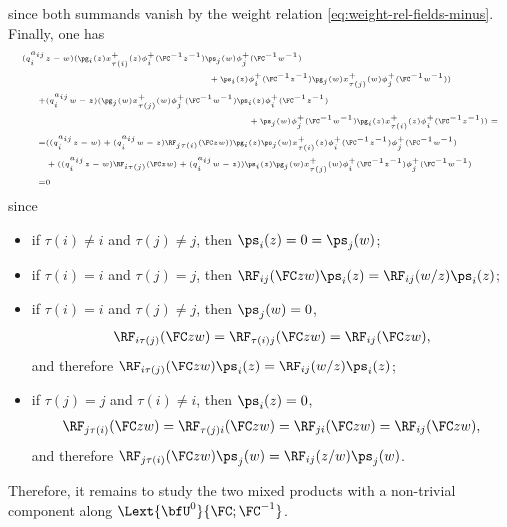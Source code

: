 \documentclass[reqno]{amsart}
\numberwithin{equation}{section}
\begin{document}
since both summands vanish by the weight relation \eqref{eq:weight-rel-fields-minus}.\\
Finally, one has
\begin{equation}\label{eq:quadratic-BC}
\tiny
\begin{split}
(q_i^{a_{ij}}&z-w)
(
\pg_i(z)x_{\tau(i)}^+(z)\phi_i^+(\FC^{-1}z^{-1})
\ps_j(w)\phi^+_j(\FC^{-1}w^{-1})\\
&\hspace{4.1cm}+\ps_i(z)\phi^+_i(\FC^{-1}z^{-1})\pg_j(w)x_{\tau(j)}^+(w)\phi^+_j(\FC^{-1}w^{-1}))\\
+&(q_i^{a_{ij}}w-z)
(\pg_j(w)x_{\tau(j)}^+(w)\phi^+_j(\FC^{-1}w^{-1})\ps_i(z)\phi^+_i(\FC^{-1}z^{-1})\\
&\hspace{5.1cm}+\ps_j(w)\phi^+_j(\FC^{-1}w^{-1})\pg_{i}(z)x_{\tau(i)}^+(z)\phi^+_i(\FC^{-1}z^{-1}))=\\
=&((q_i^{a_{ij}}z-w)
+(q_i^{a_{ij}}w-z)\RF_{j\tau(i)}(\FC zw))
\pg_i(z)\ps_j(w)x_{\tau(i)}^+(z)\phi_i^+(\FC^{-1}z^{-1})\phi^+_j(\FC^{-1}w^{-1})\\
&+((q_i^{a_{ij}}z-w)\RF_{i\tau(j)}(\FC zw)
+(q_i^{a_{ij}}w-z))
\ps_i(z)\pg_j(w)x_{\tau(j)}^+(w)\phi_i^+(\FC^{-1}z^{-1})\phi^+_j(\FC^{-1}w^{-1})\\
=&0
\end{split}
\end{equation}
since
\begin{itemize}\itemsep0.25cm
\item if $\tau(i)\neq i$ and $\tau(j)\neq j$, then $\ps_i(z)=0=\ps_j(w)$;
\item if $\tau(i)=i$ and $\tau(j)=j$, then $\RF_{ij}(\FC zw)\ps_i(z)=\RF_{ij}(w/z)\ps_i(z)$;
\item if $\tau(i)=i$ and $\tau(j)\neq j$, then $\ps_j(w)=0$,
\begin{align}
	\RF_{i\tau(j)}(\FC zw)=\RF_{\tau(i)j}(\FC zw)=\RF_{ij}(\FC zw),
\end{align}
and therefore $\RF_{i\tau(j)}(\FC zw)\ps_i(z)=\RF_{ij}(w/z)\ps_i(z)$;
\item if $\tau(j)=j$ and $\tau(i)\neq i$, then $\ps_i(z)=0$,
\begin{align}
	\RF_{j\tau(i)}(\FC zw)=\RF_{\tau(j)i}(\FC zw)=\RF_{ji}(\FC zw)=\RF_{ij}(\FC zw),
\end{align}
and therefore $\RF_{j\tau(i)}(\FC zw)\ps_j(w)=\RF_{ij}(z/w)\ps_j(w)$.
\end{itemize}
Therefore, it remains to study the two mixed products with a non-trivial component along $\Lext{\bfU^0}{\FC;\FC^{-1}}$.
\end{document}
